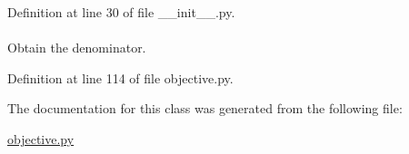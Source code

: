 \-Definition at line 30 of file \-\_\-\-\_\-init\-\_\-\-\_\-.\-py.

\hypertarget{classforcebalance_1_1objective_1_1Objective_a96dac77b10897fc43fca9e2dcf3dfee2}{
\paragraph[{\-W\-Tot}]{}}\label{classforcebalance_1_1objective_1_1Objective_a96dac77b10897fc43fca9e2dcf3dfee2}


\-Obtain the denominator. 



\-Definition at line 114 of file objective.\-py.



\-The documentation for this class was generated from the following file\-:\begin{DoxyCompactItemize}
\item 
\hyperlink{objective_8py}{objective.\-py}\end{DoxyCompactItemize}

